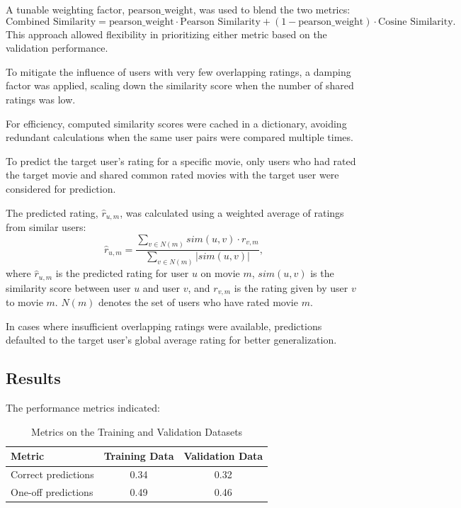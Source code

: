 \documentclass[a4paper,9pt]{article}
\begin{document}
A tunable weighting factor, \( \text{pearson\_weight} \), was used to blend the two metrics:
\begin{equation}
	\text{Combined Similarity} = \text{pearson\_weight} \cdot \text{Pearson Similarity} + (1 - \text{pearson\_weight}) \cdot \text{Cosine Similarity}.
\end{equation}
This approach allowed flexibility in prioritizing either metric based on the validation performance.

To mitigate the influence of users with very few overlapping ratings, a damping factor was applied, scaling down the
similarity score when the number of shared ratings was low.

For efficiency, computed similarity scores were cached in a dictionary, avoiding redundant calculations when the same user
pairs were compared multiple times.

To predict the target user's rating for a specific movie, only users who had rated the target movie and shared common
rated movies with the target user were considered for prediction.

The predicted rating, \( \hat{r}_{u,m} \), was calculated using a weighted average of ratings from similar users:
\begin{equation}
	\hat{r}_{u,m} = \frac{\sum_{v \in N(m)} sim(u,v) \cdot r_{v,m}}{\sum_{v \in N(m)} |sim(u,v)|},
\end{equation}
where \( \hat{r}_{u,m} \) is the predicted rating for user \( u \) on movie \( m \), \( sim(u,v) \) is the similarity score between user \( u \) and user \( v \), and \( r_{v,m} \) is the rating given by user \( v \) to movie \( m \). \( N(m) \) denotes the set of users who have rated movie \( m \).

In cases where insufficient overlapping ratings were available, predictions defaulted to the target user's global average rating for better generalization.

\subsection{Results}
The performance metrics indicated:

\begin{table}[ht]
	\centering
	\begin{tabular}{|l|c|c|}
		\hline
		\textbf{Metric}     & \textbf{Training Data} & \textbf{Validation Data} \\ \hline
		Correct predictions & 0.34                   & 0.32                     \\ \hline
		One-off predictions & 0.49                   & 0.46                     \\ \hline
	\end{tabular}
	\caption{Metrics on the Training and Validation Datasets}
	\label{tab:person_similarity_results}
\end{table}
\end{document}
